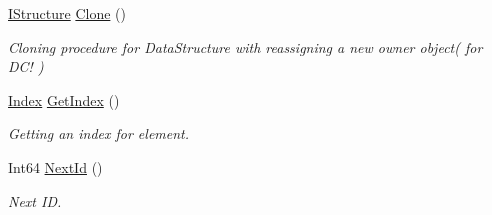 \begin{DoxyCompactItemize}
\item 
\hyperlink{interface_dwarf_d_b_1_1_data_structures_1_1_i_structure}{IStructure} \hyperlink{class_dwarf_d_b_1_1_data_structures_1_1_data_container_a246c00add5642b9674339a0319bae617}{Clone} ()
\begin{DoxyCompactList}\small\item\em Cloning procedure for DataStructure with reassigning a new owner object( for DC! ) \item\end{DoxyCompactList}\item 
\hyperlink{class_dwarf_d_b_1_1_data_structures_1_1_index}{Index} \hyperlink{class_dwarf_d_b_1_1_data_structures_1_1_data_container_a195b9a3fcaa91d3240e07164c1d5c460}{GetIndex} ()
\begin{DoxyCompactList}\small\item\em Getting an index for element. \item\end{DoxyCompactList}\item 
Int64 \hyperlink{class_dwarf_d_b_1_1_data_structures_1_1_data_container_aa239b2d6a99537175c0c7e85f88c8d7e}{NextId} ()
\begin{DoxyCompactList}\small\item\em Next ID. \item\end{DoxyCompactList}\end{DoxyCompactItemize}
